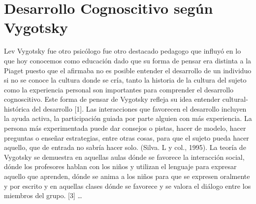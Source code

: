 \documentclass{bmcart}
\begin{document}
\section{Desarrollo Cognoscitivo según Vygotsky}
Lev Vygotsky fue otro psicólogo fue otro destacado pedagogo que influyó en lo que hoy conocemos como educación dado que su forma de pensar era distinta a la Piaget puesto que el afirmaba no es posible entender el desarrollo de un individuo si no se conoce la cultura donde se cría, tanto la historia de la cultura del sujeto como la experiencia personal son importantes para comprender el desarrollo cognoscitivo. Este forma de pensar de Vygotsky refleja su idea entender cultural-histórica del desarrollo [1].
\newline
\newline
Las interacciones que favorecen el desarrollo incluyen la ayuda activa, la participación guiada por parte alguien con más experiencia. La persona más experimentada puede dar consejos o pistas, hacer de modelo, hacer preguntas o enseñar estrategias, entre otras cosas, para que el sujeto pueda hacer aquello, que de entrada no sabría hacer solo. (Silva. L y col., 1995).
\newline
\newline
La teoría de Vygotsky se demuestra en aquellas aulas dónde se favorece la interacción social, dónde los profesores hablan con los niños y utilizan el lenguaje para expresar aquello que aprenden, dónde se anima a los niños para que se expresen oralmente y por escrito y en aquellas clases dónde se favorece y se valora el diálogo entre los miembros del grupo. [3]
\ldots
\end{document}
